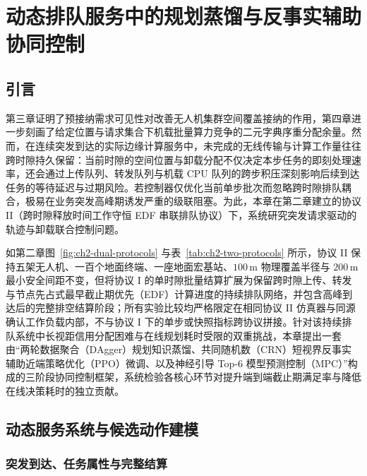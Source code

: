 \chapter{动态排队服务中的规划蒸馏与反事实辅助协同控制}
\label{cha:whole-system}
\label{cha:ch5-dynamic}

\section{引言}
\label{sec:ch5-intro}
\label{sec:whole-method}
\label{sec:ch5-motivation}

第三章证明了预接纳需求可见性对改善无人机集群空间覆盖接纳的作用，第四章进一步刻画了给定位置与请求集合下机载批量算力竞争的二元字典序重分配余量。然而，在连续突发到达的实际边缘计算服务中，未完成的无线传输与计算工作量往往跨时隙持久保留\cite{neely2010stochastic,nguyen2024deadline,li2024computing}：当前时隙的空间位置与卸载分配不仅决定本步任务的即刻处理速率，还会通过上传队列、转发队列与机载 CPU 队列的跨步积压深刻影响后续到达任务的等待延迟与过期风险。若控制器仅优化当前单步批次而忽略跨时隙排队耦合，极易在业务突发高峰期诱发严重的级联阻塞。为此，本章在第二章建立的协议 II（跨时隙释放时间工作守恒 EDF 串联排队协议）下，系统研究突发请求驱动的轨迹与卸载联合控制问题。

如第二章图~\ref{fig:ch2-dual-protocols} 与表~\ref{tab:ch2-two-protocols} 所示，协议 II 保持五架无人机、一百个地面终端、一座地面宏基站、$100\,\mathrm{m}$ 物理覆盖半径与 $200\,\mathrm{m}$ 最小安全间距不变，但将协议 I 的单时隙批量结算扩展为保留跨时隙上传、转发与节点先占式最早截止期优先（EDF）计算进度的持续排队网络，并包含高峰到达后的完整排空结算阶段；所有实验比较均严格限定在相同协议 II 仿真器与同源确认工作负载内部，不与协议 I 下的单步或快照指标跨协议拼接。针对该持续排队系统中长视距信用分配困难与在线规划耗时受限的双重挑战，本章提出一套由“两轮数据聚合（DAgger）规划知识蒸馏、共同随机数（CRN）短视界反事实辅助近端策略优化（PPO）微调、以及神经引导 Top-6 模型预测控制（MPC）”构成的三阶段协同控制框架\cite{schulman2017proximal,schulman2015high,ross2011dagger,hewing2020learning}，系统检验各核心环节对提升端到端截止期满足率与降低在线决策耗时的独立贡献。

\section{动态服务系统与候选动作建模}
\label{sec:ch5-queue-model}

\subsection{突发到达、任务属性与完整结算}

